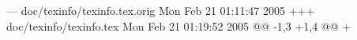--- doc/texinfo/texinfo.tex.orig	Mon Feb 21 01:11:47 2005
+++ doc/texinfo/texinfo.tex	Mon Feb 21 01:19:52 2005
@@ -1,3 +1,4 @@
+\let\pdfoutput\undefined
